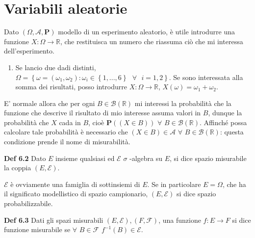 \documentclass{article}
\begin{document}
\section{Variabili aleatorie}

Dato $\left( \Omega ,\mathcal{A},\mathbf{P}\right) $ modello di un
esperimento aleatorio, \`{e} utile introdurre una funzione $X:\Omega
\rightarrow 
\mathbb{R}
$, che restituisca un numero che riassuma ci\`{o} che mi interessa
dell'esperimento.

\begin{enumerate}
\item Se lancio due dadi distinti, $\Omega =\left\{ \omega =\left( \omega
_{1},\omega _{2}\right) :\omega _{i}\in \left\{ 1,...,6\right\} \text{ }%
\forall \text{ }i=1,2\right\} $. Se sono interessata alla somma dei
risultati, posso introdurre $X:\Omega \rightarrow 
\mathbb{R}
$, $X\left( \omega \right) =\omega _{1}+\omega _{2}$.
\end{enumerate}

E' normale allora che per ogni $B\in \mathcal{B}\left( 
\mathbb{R}
\right) $ mi interessi la probabilit\`{a} che la funzione che descrive il
risultato di mio interesse assuma valori in $B$, dunque la probabilit\`{a}
che $X$ cada in $B$, cio\`{e} $\mathbf{P}\left( \left( X\in B\right) \right) 
$ $\forall $ $B\in \mathcal{B}\left( 
\mathbb{R}
\right) $. Affinch\'{e} possa calcolare tale probabilit\`{a} \`{e}
necessario che $\left( X\in B\right) \in \mathcal{A}$ $\forall $ $B\in 
\mathcal{B}\left( 
\mathbb{R}
\right) $: questa condizione prende il nome di misurabilit\`{a}.

\textbf{Def 6.2} Dato $E$ insieme qualsiasi ed $\mathcal{E}$ $\sigma $%
-algebra su $E$, si dice spazio misurabile la coppia $\left( E,\mathcal{E}%
\right) $.

$\mathcal{E}$ \`{e} ovviamente una famiglia di sottinsiemi di $E$. Se in
particolare $E=\Omega $, che ha il significato modellistico di spazio
campionario, $\left( E,\mathcal{E}\right) $ si dice spazio probabilizzabile.

\textbf{Def 6.3} Dati gli spazi misurabili $\left( E,\mathcal{E}\right)
,\left( F,\mathcal{F}\right) $, una funzione $f:E\rightarrow F$ si dice
funzione misurabile se $\forall $ $B\in \mathcal{F}$ $f^{-1}\left( B\right)
\in \mathcal{E}$.
\end{document}
